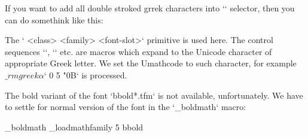 \begtt \typosize[10/12]
\endtt

If you want to add all double stroked grrek characters into `\bball`
selector, then you can do somethink like this:

\begtt \typosize[10/12]
\def\setbbgreekA #1{\Umathcode \_ea`#1 0 5 \tmpnum \advance\tmpnum by1 }

\addto{}
\endtt
%
The ` <class> <family> <font-slot>` primitive is used
here. The control sequences `\alpha`, `\beta` etc. are macros which expand
to the Unicode character of appropriate Greek letter. We set the
Umathcode to such character, for example
$\_rmgreek\alpha$` 0 5 "0B` is processed.

The bold variant of the font `bbold*.tfm` is not available, unfortunately.
We have to settle for normal version of the font in the `\_boldmath` macro:

\begtt \typosize[10/12]
   \addto \_boldmath {\_loadmathfamily 5 bbold }
\endtt


\bye
